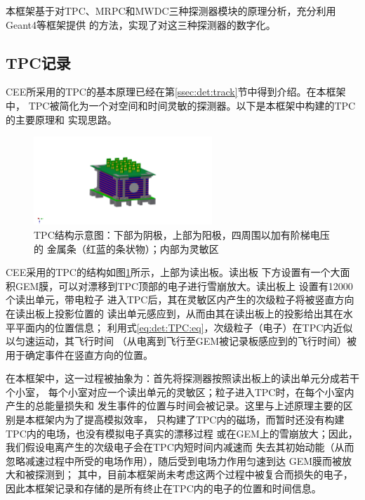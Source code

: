 \documentclass[bachelor,openany,oneside,color]{buaathesis}
\begin{document}
本框架基于对TPC、MRPC和MWDC三种探测器模块的原理分析，充分利用Geant4等框架提供
的方法，实现了对这三种探测器的数字化。

\subsection{TPC记录}\label{ssec:digi:TPC}

CEE所采用的TPC的基本原理已经在第\ref{ssec:det:track}节中得到介绍。在本框架中，
TPC被简化为一个对空间和时间灵敏的探测器。以下是本框架中构建的TPC的主要原理和
实现思路。

\begin{figure}
	\centering
	\includegraphics[width=0.6\textwidth]{./resource/CEE-TPC-Overview.png}
	\caption{TPC结构示意图：下部为阴极，上部为阳极，四周围以加有阶梯电压的
		金属条（红蓝的条状物）；内部为灵敏区}
	\label{fig:det:TPC:Overview}
\end{figure}

CEE采用的TPC的结构如图\ref{fig:det:TPC:Overview}所示，上部为读出板。读出板
下方设置有一个大面积GEM膜，可以对漂移到TPC顶部的电子进行雪崩放大。读出板上
设置有12000个读出单元\cite{技术文档}，带电粒子
进入TPC后，其在灵敏区内产生的次级粒子将被竖直方向在读出板上投影位置的
读出单元感应到，从而由其在读出板上的投影给出其在水平平面内的位置信息；
利用式\ref{eq:det:TPC:eq}，次级粒子（电子）在TPC内近似以匀速运动，其飞行时间
（从电离到飞行至GEM被记录板感应到的飞行时间）被用于确定事件在竖直方向的位置。

在本框架中，这一过程被抽象为：首先将探测器按照读出板上的读出单元分成若干个小室，
每个小室对应一个读出单元的灵敏区；粒子进入TPC时，在每个小室内产生的总能量损失和
发生事件的位置与时间会被记录。这里与上述原理主要的区别是本框架内为了提高模拟效率，
只构建了TPC内的磁场，而暂时还没有构建TPC内的电场，也没有模拟电子真实的漂移过程
或在GEM上的雪崩放大；因此，我们假设电离产生的次级电子会在TPC内短时间内减速而
失去其初始动能（从而忽略减速过程中所受的电场作用），随后受到电场力作用匀速到达
GEM膜而被放大和被探测到；
其中，目前本框架尚未考虑这两个过程中被复合而损失的电子，
因此本框架记录和存储的是所有终止在TPC内的电子的位置和时间信息。
\end{document}

